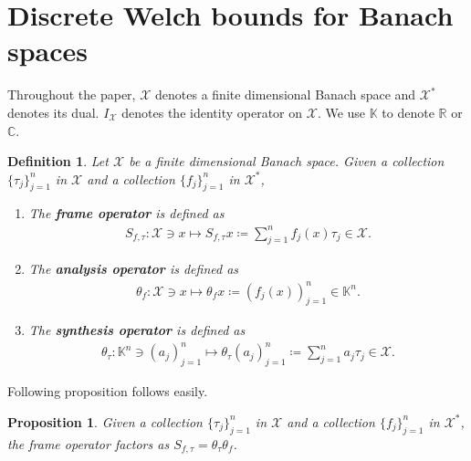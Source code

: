 \documentclass{amsart}
\newtheorem{definition}[theorem]{Definition}
\newtheorem{proposition}[theorem]{Proposition}
\begin{document}
 
 
 
 
 
 
 
 
 
 
 
 
 
 
 

 
 
 
 
 
 
 
 


\section{Discrete Welch bounds for Banach spaces}
Throughout the paper,  $\mathcal{X}$ denotes a finite dimensional  Banach space and $\mathcal{X}^*$ denotes its  dual. $ I_\mathcal{X}$ denotes the identity operator on $\mathcal{X}$.  We use $\mathbb{K}$ to denote $\mathbb{R}$  or $\mathbb{C}$.
 \begin{definition}
 Let 	$\mathcal{X}$ be a finite dimensional Banach space. Given a collection $\{\tau_j\}_{j=1}^n$ in $\mathcal{X}$  and 	  a collection $\{f_j\}_{j=1}^n$  in  $\mathcal{X}^*$,  
 \begin{enumerate}[\upshape(i)]
 	\item The \textbf{frame operator} is defined as 
 	\begin{align*}
 		S_{f, \tau}:\mathcal{X}\ni x \mapsto S_{f, \tau}x\coloneqq \sum_{j=1}^n
 		f_j(x)\tau_j \in\mathcal{X}.
 	\end{align*}
 	\item The \textbf{analysis operator} is defined as 
 	\begin{align*}
 		\theta_f:\mathcal{X}\ni x \mapsto \theta_fx\coloneqq (f_j(x))_{j=1}^n \in \mathbb{K}^n.
 	\end{align*}
 	\item The \textbf{synthesis operator} is defined as 
 		\begin{align*}
 		\theta_\tau: \mathbb{K}^n \ni (a_j)_{j=1}^n \mapsto \theta_\tau (a_j)_{j=1}^n \coloneqq \sum_{j=1}^n
 		a_j\tau_j \in\mathcal{X}.
 	\end{align*}
 \end{enumerate}
 \end{definition}
Following proposition follows easily.
\begin{proposition}
Given a collection $\{\tau_j\}_{j=1}^n$ in $\mathcal{X}$  and 	  a collection $\{f_j\}_{j=1}^n$  in  $\mathcal{X}^*$, the frame operator factors as $	S_{f, \tau}=\theta_\tau\theta_f$.	
\end{proposition}
\end{document}
